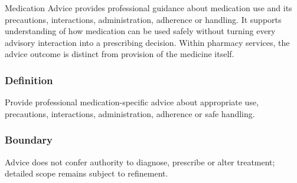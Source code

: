 Medication Advice provides professional guidance about medication use and its precautions, interactions, administration, adherence or handling. It supports understanding of how medication can be used safely without turning every advisory interaction into a prescribing decision. Within pharmacy services, the advice outcome is distinct from provision of the medicine itself.

\subsubsection*{Definition}

Provide professional medication-specific advice about appropriate use, precautions, interactions, administration, adherence or safe handling.

\subsubsection*{Boundary}

Advice does not confer authority to diagnose, prescribe or alter treatment; detailed scope remains subject to refinement.

